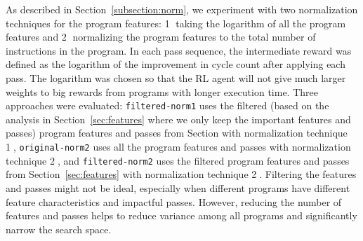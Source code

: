 As described in Section~\ref{subsection:norm}, we experiment with two normalization techniques for the program features: \textcircled{1} taking the logarithm of all the program features and \textcircled{2} normalizing the program features to the total number of instructions in the program.  
In each pass sequence, the intermediate reward was defined as the logarithm of the improvement in cycle count after applying each pass. The logarithm was chosen so that the RL agent will not give much larger weights to big rewards from programs with longer execution time. Three approaches were evaluated: \texttt{filtered-norm1}
uses the filtered (based on the analysis in Section~\ref{sec:features} where we only keep the important features and passes) program features and passes from Section with normalization technique \textcircled{1}, \texttt{original-norm2} uses all the program features and passes with normalization technique \textcircled{2}, and \texttt{filtered-norm2} uses the filtered program features and passes from Section~\ref{sec:features} with normalization technique \textcircled{2}. 
Filtering the features and passes might not be ideal, especially when different programs have different feature characteristics and impactful passes. However, reducing the number of features and passes helps to reduce variance among all programs and significantly narrow the search space. %


